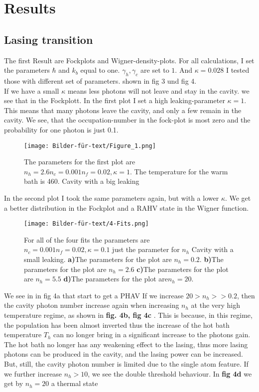 \documentclass[12pt,a4paper]{article}
\begin{document}
\section{Results}
\subsection{Lasing transition}
The first Result are Fockplots and Wigner-density-plots.
For all calculations, I set the parameters  $\hbar$ and $k_b$ equal to one. $\gamma_h, \gamma_c $ are set to $ 1$. And $\kappa=0.028$
I tested those with different set of parameters. 
shown in fig 3 und fig 4.\\

If we have a small $\kappa$ means less photons will not leave and stay in the cavity. we see that in the Fockplott.
In the first plot I set a high leaking-parameter $\kappa=1$.
This means that many photons leave the cavity, and only a few remain in the cavity. 
We see, that the occupation-number in the fock-plot is most zero and the probability for one photon is just 0.1.

\begin{figure}[hbtp]
\centering
\texttt{[image: Bilder-für-text/Figure\_1.png]}
\caption{The parameters for the first plot are$ n_h=2.6 n_c=0.001 n_f=0.02,\kappa=1$. The temperature for the warm bath is 460. Cavity with a big leaking}
\end{figure}\newpage

In the second plot I took the same parameters again, but with a lower $\kappa$. We get a better distribution in the Fockplot and a RAHV state in the Wigner function. 

\begin{figure}[h!]
\centering
\texttt{[image: Bilder-für-text/4-Fits.png]}
\caption{For all of the four fits the parameters are $n_c=0.001 n_f=0.02,\kappa=0.1$ just the parameter for $n_h$ Cavity with a small leaking.
\textbf{a)}The parameters for the plot are $n_h=0.2 $.
\textbf{b)}The parameters for the plot are $ n_h=2.6$ 
\textbf{c)}The parameters for the plot are $ n_h=5.5$ 
\textbf{d)}The parameters for the plot are$ n_h=20$. 
}
\end{figure}
We see in in fig 4a that start to get a PHAV
If we increase  $20>n_h >>0.2 $,
then the cavity photon number increase again when increasing $n_h$ at the very
high temperature regime, as shown in \textbf{fig. 4b, fig 4c }. This is because,
in this regime, the population has been almost inverted
thus the increase of the hot bath temperature $T_h$
can no longer bring in a significant increase to the photons gain.
The hot bath no longer has
any weakening effect to the lasing, thus more lasing photons
can be produced in the cavity, and the lasing power can be
increased. But, still, the cavity photon number is limited due to
the single atom feature.
If we further increase  $n_h >10$, we see the double threshold behaviour. 
In \textbf{fig 4d} we get by $n_h=20$ a thermal state
\end{document}
